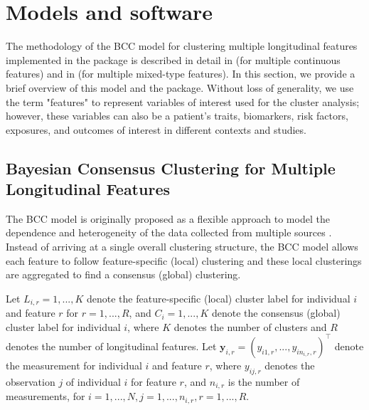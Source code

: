 \section{Models and software} \label{sec:models}

The methodology of the BCC model for clustering multiple longitudinal features implemented in the  package is described in detail in \citet{Lu2022} (for multiple continuous features) and in \citet{Tan2022a} (for multiple mixed-type features). In this section, we provide a brief overview of this model and the  package. Without loss of generality, we use the term "features" to represent variables of interest used for the cluster analysis; however, these variables can also be a patient's traits, biomarkers, risk factors, exposures, and outcomes of interest in different contexts and studies.

\subsection{Bayesian Consensus Clustering for Multiple Longitudinal Features}

The BCC model is originally proposed as a flexible approach to model the dependence and heterogeneity of the data collected from multiple sources \citep{Lock2013}. Instead of arriving at a single overall clustering structure, the BCC model allows each feature to follow feature-specific (local) clustering and these local clusterings are aggregated to find a consensus (global) clustering.

Let $L_{i,r} = 1,...,K$ denote the feature-specific (local) cluster label for individual $i$ and feature $r$ for $r=1,...,R$, and $C_i = 1,...,K$ denote the consensus (global) cluster label for individual $i$, where $K$ denotes the number of clusters and $R$ denotes the number of longitudinal features. Let $\boldsymbol{y}_{i,r} = (y_{i1,r}, ..., y_{in_{i,r},r})^\top$ denote the measurement for individual $i$ and feature $r$, where $y_{ij,r}$ denotes the observation $j$ of individual $i$ for feature $r$, and $n_{i,r}$ is the number of measurements, for $i=1,...,N, j=1,...,n_{i,r}, r=1,...,R$.

